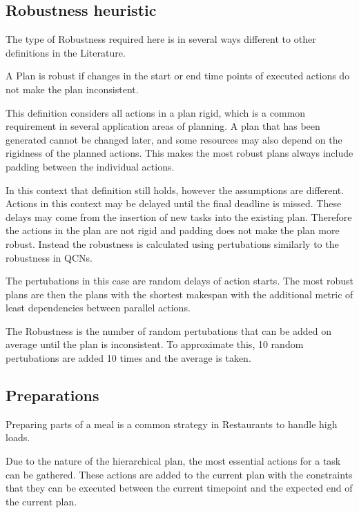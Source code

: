 \subsection{Robustness heuristic}

The type of Robustness required here is in several ways different to other definitions in the Literature.

\begin{definition}
    A Plan is robust if changes in the start or end time points of executed actions do not make the plan inconsistent.  
\end{definition}

This definition considers all actions in a plan rigid, which is a common requirement in several application areas of planning.
A plan that has been generated cannot be changed later, and some resources may also depend on the rigidness of the planned actions. 
This makes the most robust plans always include padding between the individual actions.

In this context that definition still holds, however the assumptions are different.
Actions in this context may be delayed until the final deadline is missed.
These delays may come from the insertion of new tasks into the existing plan.
Therefore the actions in the plan are not rigid and padding does not make the plan more robust.
Instead the robustness is calculated using pertubations similarly to the robustness in QCNs.

The pertubations in this case are random delays of action starts.
The most robust plans are then the plans with the shortest makespan with the additional metric of least dependencies between parallel actions.


The Robustness is the number of random pertubations that can be added on average until the plan is inconsistent.
To approximate this, 10 random pertubations are added 10 times and the average is taken.


\subsection{Preparations}

Preparing parts of a meal is a common strategy in Restaurants to handle high loads.

Due to the nature of the hierarchical plan, the most essential actions for a task can be gathered.
These actions are added to the current plan with the constraints that they can be executed between the current timepoint and the expected end of the current plan.

